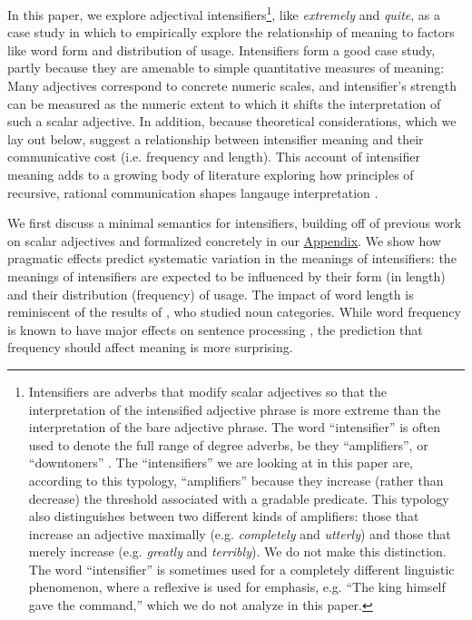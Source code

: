 \documentclass[10pt,letterpaper]{article}
\newcommand{\w}[1]{\emph{#1}}
\begin{document}
In this paper, we explore adjectival intensifiers\footnote{
Intensifiers are adverbs that modify scalar adjectives so that the interpretation of the intensified adjective phrase is more extreme than the interpretation of the bare adjective phrase.
The word ``intensifier'' is often used to denote the full range of degree adverbs, be they ``amplifiers'', or ``downtoners'' \cite{quirk}.
The ``intensifiers'' we are looking at in this paper are, according to this typology, ``amplifiers'' because they increase (rather than decrease) the threshold associated with a gradable predicate.
This typology also distinguishes between two different kinds of amplifiers: those that increase an adjective maximally (e.g. \w{completely} and \w{utterly}) and those that merely increase (e.g. \w{greatly} and \w{terribly}).
We do not make this distinction.
The word ``intensifier'' is sometimes used for a completely different linguistic phenomenon, where a reflexive is used for emphasis, e.g. ``The king himself gave the command,'' which we do not analyze in this paper. 
},
like \w{extremely} and \w{quite}, as a case study in which to empirically explore the relationship of meaning to factors like word form and distribution of usage.
Intensifiers form a good case study, partly because they are amenable to simple quantitative measures of meaning: Many adjectives correspond to concrete numeric scales, and intensifier's strength can be measured as the numeric extent to which it shifts the interpretation of such a scalar adjective. In addition, because theoretical considerations, which we lay out below, suggest a relationship between intensifier meaning and their communicative cost (i.e. frequency and length).
This account of intensifier meaning adds to a growing body of literature exploring how principles of recursive, rational communication shapes langauge interpretation \cite[e.g.]{grice, frank, goodman, Franke2011, Russell2012, kao2014nonliteral, bergen2014pragmatic}.

We first discuss a minimal semantics for intensifiers, building off of previous work on scalar adjectives and formalized concretely in our \hyperref[app:model]{Appendix}.
We show how pragmatic effects predict systematic variation in the meanings of intensifiers: the meanings of intensifiers are expected to be influenced by their form (in length) and their distribution (frequency) of usage.
The impact of word length is reminiscent of the results of \cite{lewis}, who studied noun categories.
While word frequency is known to have major effects on sentence processing \cite[e.g.]{levy}, the prediction that frequency should affect meaning is more surprising.
\end{document}
